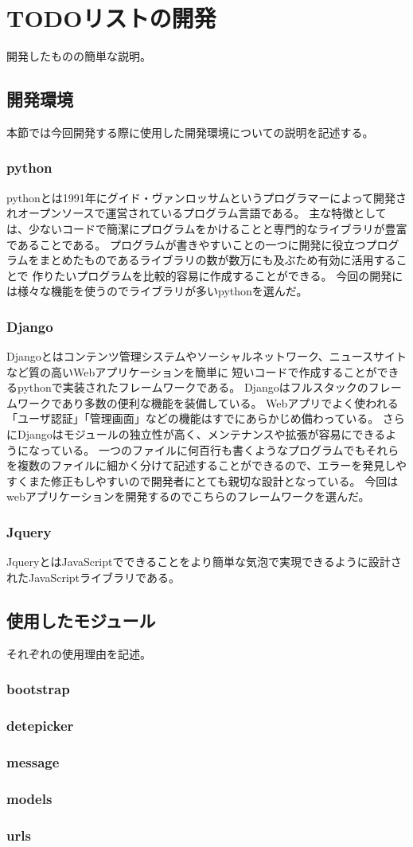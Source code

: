 \chapter{TODOリストの開発}
\label{cha:Development}
開発したものの簡単な説明。

\section{開発環境}
本節では今回開発する際に使用した開発環境についての説明を記述する。
\subsection{python}
pythonとは1991年にグイド・ヴァンロッサムというプログラマーによって開発されオープンソースで運営されているプログラム言語である。
主な特徴としては、少ないコードで簡潔にプログラムをかけることと専門的なライブラリが豊富であることである。
プログラムが書きやすいことの一つに開発に役立つプログラムをまとめたものであるライブラリの数が数万にも及ぶため有効に活用することで
作りたいプログラムを比較的容易に作成することができる。
今回の開発には様々な機能を使うのでライブラリが多いpythonを選んだ。
\subsection{Django}
Djangoとはコンテンツ管理システムやソーシャルネットワーク、ニュースサイトなど質の高いWebアプリケーションを簡単に
短いコードで作成することができるpythonで実装されたフレームワークである。
Djangoはフルスタックのフレームワークであり多数の便利な機能を装備している。
Webアプリでよく使われる「ユーザ認証」「管理画面」などの機能はすでにあらかじめ備わっている。
さらにDjangoはモジュールの独立性が高く、メンテナンスや拡張が容易にできるようになっている。
一つのファイルに何百行も書くようなプログラムでもそれらを複数のファイルに細かく分けて記述することができるので、エラーを発見しやすくまた修正もしやすいので開発者にとても親切な設計となっている。
今回はwebアプリケーションを開発するのでこちらのフレームワークを選んだ。
\subsection{Jquery}
JqueryとはJavaScriptでできることをより簡単な気泡で実現できるように設計されたJavaScriptライブラリである。

\section{使用したモジュール}
それぞれの使用理由を記述。
\subsection{bootstrap}

\subsection{detepicker}

\subsection{message}

\subsection{models}

\subsection{urls}
